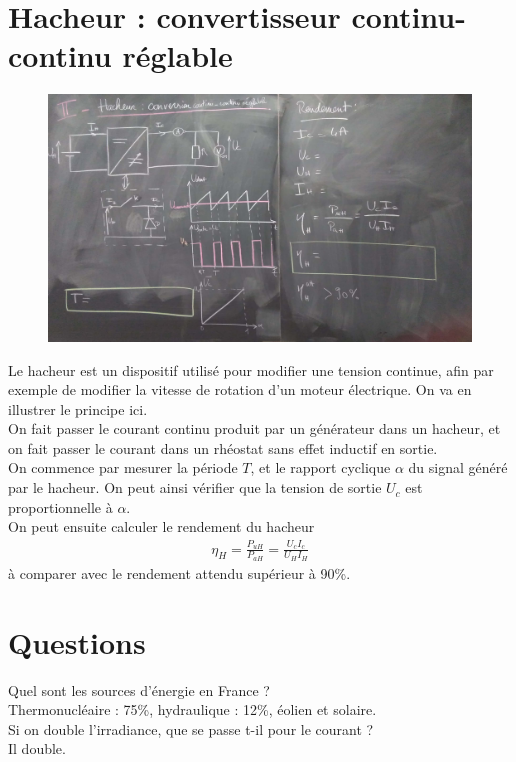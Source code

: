 \documentclass[12pt,prb,aps,epsf]{article}
\begin{document}
\section{Hacheur : convertisseur continu-continu réglable}
\begin{figure}[h]
	\centering \includegraphics[width=18cm]{T2}
\end{figure}
Le hacheur est un dispositif utilisé pour modifier une tension continue, afin par exemple de modifier la vitesse de rotation d'un moteur électrique. On va en illustrer le principe ici.\\

On fait passer le courant continu produit par un générateur dans un hacheur, et on fait passer le courant dans un rhéostat sans effet inductif en sortie.\\
On commence par mesurer la période $T$, et le rapport cyclique $\alpha$ du signal généré par le hacheur. On peut ainsi vérifier que la tension de sortie $U_c$ est proportionnelle à $\alpha$.\\

On peut ensuite calculer le rendement du hacheur 
\begin{eqnarray}
\eta_H = \frac{P_{uH}}{P_{aH}} = \frac{U_cI_c}{U_HI_H}
\end{eqnarray}
à comparer avec le rendement attendu supérieur à 90\%.

\section*{Questions}
Quel sont les sources d'énergie en France ?\\
Thermonucléaire : 75\%, hydraulique : 12\%, éolien et solaire.\\

Si on double l'irradiance, que se passe t-il pour le courant ?\\
Il double.\\
\end{document}
